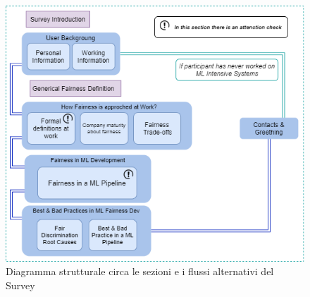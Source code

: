     
    \begin{figure}
        \centering
        \includegraphics[width=1\textwidth]{figure/Survey Structural diagram.png}
        \caption{Diagramma strutturale circa le sezioni e i flussi alternativi del Survey}
    \end{figure}

\newpage
